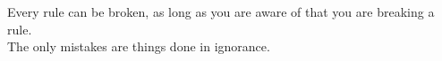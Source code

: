 \documentclass[aspectratio=169]{beamer}
\begin{document}
	\begin{frame}
		
		{\LARGE Every rule can be broken, as long as you are aware of that you are breaking a rule.}\\
		\vspace{7ex}
		{\LARGE The only mistakes are things done in ignorance.}
		
	\end{frame}
\end{document}
